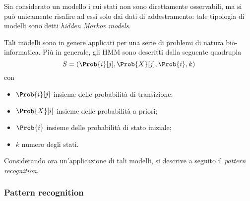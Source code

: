 \documentclass{subfiles}
\begin{document}
Sia considerato un modello i cui stati non sono direttamente osservabili, ma si può unicamente risalire ad essi solo dai dati di addestramento:
tale tipologia di modelli sono detti \emph{hidden Markov models}.

Tali modelli sono in genere applicati per una serie di problemi di natura bio-informatica.
Più in generale, gli HMM sono descritti dalla seguente quadrupla
\[
    S = (\Prob{i}[j], \Prob{X}[j], \Prob{i}, k)
\]
con
\begin{itemize}
    \item \(\Prob{i}[j]\) insieme delle probabilità di transizione;
    \item \(\Prob{X}[i]\) insieme delle probabilità a priori;
    \item \(\Prob{i}\) insieme delle probabilità di stato iniziale;
    \item \(k\) numero degli stati.
\end{itemize}

Considerando ora un'applicazione di tali modelli, si descrive a seguito il \emph{pattern recognition}.

\subsubsection{Pattern recognition}

\end{document}
